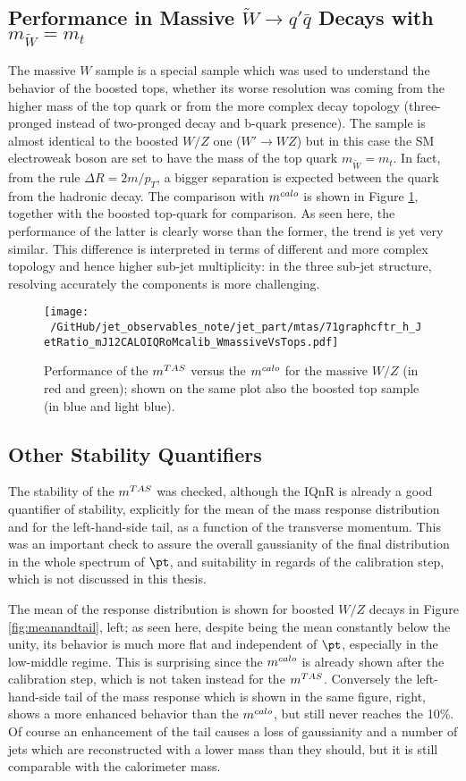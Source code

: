\subsection{Performance in Massive $\tilde{W}\to q'\bar{q}$ Decays with $m_{\tilde{W}}=m_t$}
The massive $W$ sample is a special sample which was used to understand the behavior of the boosted tops, whether its worse resolution was coming from the higher mass of the top quark or from the more complex decay topology (three-pronged instead of two-pronged decay and b-quark presence). 
The sample is almost identical to the boosted $W/Z$ one ($W'\to WZ$) but in this case the SM electroweak boson are set to have the mass of the top quark $m_{\tilde{W}}=m_t$.
In fact, from the rule $\Delta R=2m/p_T$, a bigger separation is expected between the quark from the hadronic decay.
The comparison with $m^{calo}$ is shown in Figure \ref{fig:mtas6}, together with the boosted top-quark for comparison. As seen here, the performance of the latter is clearly worse than the former, the trend is yet very similar. This difference is interpreted in terms of different and more complex topology and hence higher sub-jet multiplicity: in the three sub-jet structure, resolving accurately the components is more challenging.

\begin{figure}[!ht]
  \centering
     \texttt{[image: ~/GitHub/jet\_observables\_note/jet\_part/mtas/71graphcftr\_h\_JetRatio\_mJ12CALOIQRoMcalib\_WmassiveVsTops.pdf]}
   \caption[$\mtas$ for boosted massive $W/Z$]{Performance of the $\mtas$ versus the $m^{calo}$ for the massive $W/Z$ (in red and green); shown on the same plot also the boosted top sample (in blue and light blue).}
  \label{fig:mtas6}
\end{figure}

\subsection{Other Stability Quantifiers}
The stability of the $\mtas$ was checked, although the IQnR is already a good quantifier of stability, explicitly for the mean of the mass response distribution and for the left-hand-side tail, as a function of the transverse momentum. This was an important check to assure the overall gaussianity of the final distribution in the whole spectrum of $\pt$, and suitability in regards of the calibration step, which is not discussed in this thesis.

The mean of the response distribution is shown for boosted $W/Z$ decays in Figure \ref{fig:meanandtail}, left; as seen here, despite being the mean constantly below the unity, its behavior is much more flat and independent of $\pt$, especially in the low-middle regime. This is surprising since the $m^{calo}$ is already shown after the calibration step, which is not taken instead for the $\mtas$. Conversely the left-hand-side tail of the mass response which is shown in the same figure, right, shows a more enhanced behavior than the $m^{calo}$, but still never reaches the 10\%. Of course an enhancement of the tail causes a loss of gaussianity and a number of jets which are reconstructed with a lower mass than they should, but it is still comparable with the calorimeter mass.

